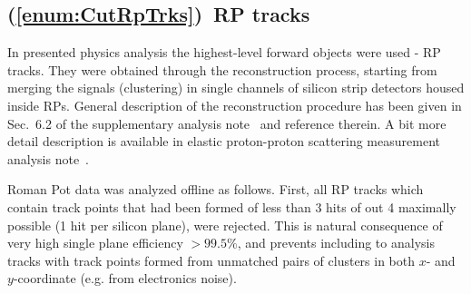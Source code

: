 \subsection{(\ref{enum:CutRpTrks})~RP tracks}\label{sec:C4}

In presented physics analysis the highest-level forward objects were used - RP tracks. They were obtained through the reconstruction process, starting from merging the signals (clustering) in single channels of silicon strip detectors housed inside RPs. General description of the reconstruction procedure has been given in Sec.~6.2 of the supplementary analysis note~\cite{supplementaryNote} and reference therein. A bit more detail description is available in elastic proton-proton scattering measurement analysis note~\cite{elasticNote}.


Roman Pot data was analyzed offline as follows. First, all RP tracks which contain track points that had been formed of less than 3 hits of out 4 maximally possible (1 hit per silicon plane), were rejected. This is natural consequence of very high single plane efficiency $>99.5\%$, and prevents including to analysis tracks with track points formed from unmatched pairs of clusters in both $x$- and $y$-coordinate (e.g. from electronics noise).

